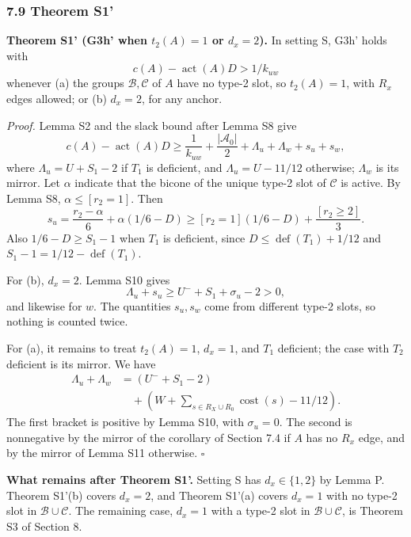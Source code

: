 \subsubsection*{7.9 Theorem S1'}
\textbf{Theorem S1' (G3h' when $t_2(A)=1$ or $d_x=2$).} In setting S, G3h' holds with
\[
 c(A)-\operatorname{act}(A)D>1/k_{uw}
\]
whenever (a) the groups $\mathcal B,\mathcal C$ of $A$ have no type-2 slot, so $t_2(A)=1$, with $R_x$ edges allowed; or (b) $d_x=2$, for any anchor.

\emph{Proof.} Lemma S2 and the slack bound after Lemma S8 give
\[
 c(A)-\operatorname{act}(A)D\ge\frac1{k_{uw}}+\frac{|\mathcal A_0|}2
     +\Lambda_u+\Lambda_w+s_u+s_w,
\]
where $\Lambda_u=U+S_1-2$ if $T_1$ is deficient, and $\Lambda_u=U-11/12$ otherwise; $\Lambda_w$ is its mirror. Let $\alpha$ indicate that the bicone of the unique type-2 slot of $\mathcal C$ is active. By Lemma S8, $\alpha\le[r_2=1]$. Then
\[
 s_u=\frac{r_2-\alpha}{6}+\alpha(1/6-D)
 \ge[r_2=1](1/6-D)+\frac{[r_2\ge2]}3.
\]
Also $1/6-D\ge S_1-1$ when $T_1$ is deficient, since $D\le\operatorname{def}(T_1)+1/12$ and $S_1-1=1/12-\operatorname{def}(T_1)$.

For (b), $d_x=2$. Lemma S10 gives
\[
 \Lambda_u+s_u\ge U^-+S_1+\sigma_u-2>0,
\]
and likewise for $w$. The quantities $s_u,s_w$ come from different type-2 slots, so nothing is counted twice.

For (a), it remains to treat $t_2(A)=1$, $d_x=1$, and $T_1$ deficient; the case with $T_2$ deficient is its mirror. We have
\[
\begin{aligned}
 \Lambda_u+\Lambda_w
  &=(U^-+S_1-2)\\
  &\quad+\left(W+\sum_{s\in R_X\cup R_0}\operatorname{cost}(s)-11/12\right).
\end{aligned}
\]
The first bracket is positive by Lemma S10, with $\sigma_u=0$. The second is nonnegative by the mirror of the corollary of Section 7.4 if $A$ has no $R_x$ edge, and by the mirror of Lemma S11 otherwise. \hfill$\square$

\textbf{What remains after Theorem S1'.} Setting S has $d_x\in\{1,2\}$ by Lemma P. Theorem S1'(b) covers $d_x=2$, and Theorem S1'(a) covers $d_x=1$ with no type-2 slot in $\mathcal B\cup\mathcal C$. The remaining case, $d_x=1$ with a type-2 slot in $\mathcal B\cup\mathcal C$, is Theorem S3 of Section 8.
